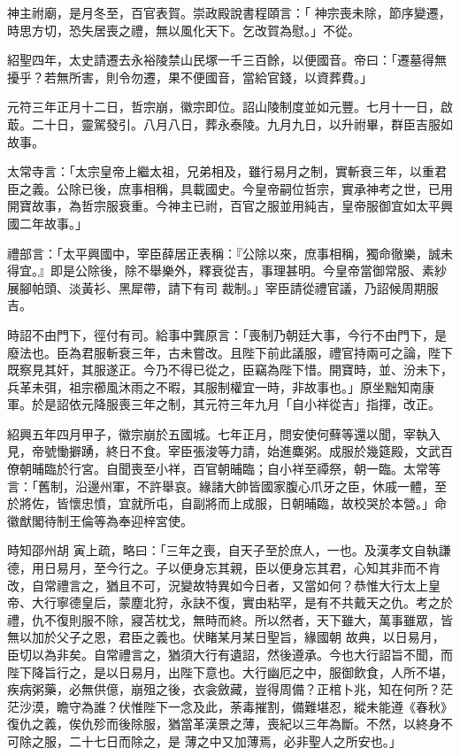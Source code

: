 \begin{pinyinscope}
 神主祔廟，是月冬至，百官表賀。崇政殿說書程頤言：「
 神宗喪未除，節序變遷，時思方切，恐失居喪之禮，無以風化天下。乞改賀為慰。」不從。



 紹聖四年，太史請遷去永裕陵禁山民塚一千三百餘，以便國音。帝曰：「遷墓得無擾乎？若無所害，則令勿遷，果不便國音，當給官錢，以資葬費。」



 元符三年正月十二日，哲宗崩，徽宗即位。詔山陵制度並如元豐。七月十一日，啟菆。二十日，靈駕發引。八月八日，葬永泰陵。九月九日，以升祔畢，群臣吉服如故事。



 太常寺言：「太宗皇帝上繼太祖，兄弟相及，雖行易月之制，實斬衰三年，以重君臣之義。公除已後，庶事相稱，具載國史。今皇帝嗣位哲宗，實承神考之世，已用開寶故事，為哲宗服衰重。今神主已祔，百官之服並用純吉，皇帝服御宜如太平興國二年故事。」



 禮部言：「太平興國中，宰臣薛居正表稱：『公除以來，庶事相稱，獨命徹樂，誠未得宜。』即是公除後，除不舉樂外，釋衰從吉，事理甚明。今皇帝當御常服、素紗展腳帕頭、淡黃衫、黑犀帶，請下有司
 裁制。」宰臣請從禮官議，乃詔候周期服吉。



 時詔不由門下，徑付有司。給事中龔原言：「喪制乃朝廷大事，今行不由門下，是廢法也。臣為君服斬衰三年，古未嘗改。且陛下前此議服，禮官持兩可之論，陛下既察見其奸，其服遂正。今乃不得已從之，臣竊為陛下惜。開寶時，並、汾未下，兵革未弭，祖宗櫛風沐雨之不暇，其服制權宜一時，非故事也。」原坐黜知南康軍。於是詔依元降服喪三年之制，其元符三年九月「自小祥從吉」指揮，改正。



 紹興五年四月甲子，徽宗崩於五國城。七年正月，問安使何蘚等還以聞，宰執入見，帝號慟擗踴，終日不食。宰臣張浚等力請，始進麋粥。成服於幾筵殿，文武百僚朝晡臨於行宮。自聞喪至小祥，百官朝晡臨；自小祥至禫祭，朝一臨。太常等言：「舊制，沿邊州軍，不許舉哀。緣諸大帥皆國家腹心爪牙之臣，休戚一體，至於將佐，皆懷忠憤，宜就所屯，自副將而上成服，日朝晡臨，故校哭於本營。」命徽猷閣待制王倫等為奉迎梓宮使。



 時知邵州胡
 寅上疏，略曰：「三年之喪，自天子至於庶人，一也。及漢孝文自執謙德，用日易月，至今行之。子以便身忘其親，臣以便身忘其君，心知其非而不肯改，自常禮言之，猶且不可，況變故特異如今日者，又當如何？恭惟大行太上皇帝、大行寧德皇后，蒙塵北狩，永訣不復，實由粘罕，是有不共戴天之仇。考之於禮，仇不復則服不除，寢苫枕戈，無時而終。所以然者，天下雖大，萬事雖眾，皆無以加於父子之恩，君臣之義也。伏睹某月某日聖旨，緣國朝
 故典，以日易月，臣切以為非矣。自常禮言之，猶須大行有遺詔，然後遵承。今也大行詔旨不聞，而陛下降旨行之，是以日易月，出陛下意也。大行幽厄之中，服御飲食，人所不堪，疾病粥藥，必無供億，崩殂之後，衣衾斂藏，豈得周備？正棺卜兆，知在何所？茫茫沙漠，瞻守為誰？伏惟陛下一念及此，荼毒摧割，備難堪忍，縱未能遵《春秋》復仇之義，俟仇殄而後除服，猶當革漢景之薄，喪紀以三年為斷。不然，以終身不可除之服，二十七日而除之，是
 薄之中又加薄焉，必非聖人之所安也。」




\end{pinyinscope}

